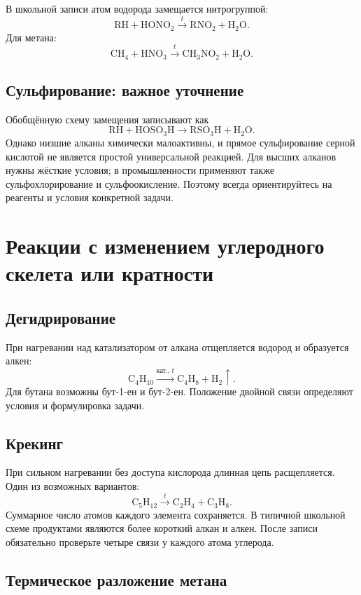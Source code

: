 \documentclass[a4paper,12pt]{article}
\newcommand{\chem}[1]{\ensuremath{\mathrm{#1}}}
\begin{document}
В школьной записи атом водорода замещается нитрогруппой:
\[
\chem{RH+HONO_2}\xrightarrow{t}\chem{RNO_2+H_2O}.
\]
Для метана:
\[
\chem{CH_4+HNO_3}\xrightarrow{t}\chem{CH_3NO_2+H_2O}.
\]

\subsection{Сульфирование: важное уточнение}

Обобщённую схему замещения записывают как
\[
\chem{RH+HOSO_3H}\longrightarrow\chem{RSO_3H+H_2O}.
\]
Однако низшие алканы химически малоактивны, и прямое сульфирование серной кислотой не является простой универсальной реакцией. Для высших алканов нужны жёсткие условия; в промышленности применяют также сульфохлорирование и сульфоокисление. Поэтому всегда ориентируйтесь на реагенты и условия конкретной задачи.

\section{Реакции с изменением углеродного скелета или кратности}

\subsection{Дегидрирование}

При нагревании над катализатором от алкана отщепляется водород и образуется алкен:
\[
\chem{C_4H_{10}}\xrightarrow{\text{кат.},\,t}\chem{C_4H_8+H_2}\!\uparrow.
\]
Для бутана возможны бут-1-ен и бут-2-ен. Положение двойной связи определяют условия и формулировка задачи.

\subsection{Крекинг}

При сильном нагревании без доступа кислорода длинная цепь расщепляется. Один из возможных вариантов:
\[
\chem{C_5H_{12}}\xrightarrow{t}\chem{C_2H_4+C_3H_8}.
\]
Суммарное число атомов каждого элемента сохраняется. В типичной школьной схеме продуктами являются более короткий алкан и алкен. После записи обязательно проверьте четыре связи у каждого атома углерода.

\subsection{Термическое разложение метана}
\end{document}
